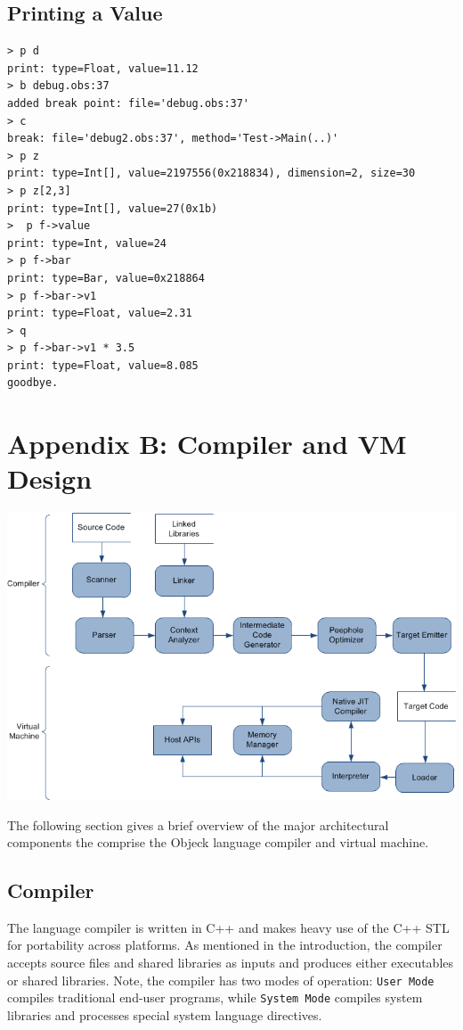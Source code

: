 \documentclass[11pt]{article}
\begin{document}
\subsection{Printing a Value}
\begin{verbatim}
> p d
print: type=Float, value=11.12
> b debug.obs:37
added break point: file='debug.obs:37'
> c
break: file='debug2.obs:37', method='Test->Main(..)'
> p z
print: type=Int[], value=2197556(0x218834), dimension=2, size=30
> p z[2,3]
print: type=Int[], value=27(0x1b)
>  p f->value
print: type=Int, value=24
> p f->bar
print: type=Bar, value=0x218864
> p f->bar->v1
print: type=Float, value=2.31
> q
> p f->bar->v1 * 3.5
print: type=Float, value=8.085
goodbye.
\end{verbatim}

\section{Appendix B: Compiler and VM Design}
\includegraphics[scale=0.60]{../../images/compiler_data_flow.png}

The following section gives a brief overview of the major
architectural components the comprise the Objeck language compiler and
virtual machine.

\subsection{Compiler}
The language compiler is written in C++ and makes heavy use of the C++
STL for portability across platforms.  As mentioned in the
introduction, the compiler accepts source files and shared libraries
as inputs and produces either executables or shared libraries.  Note,
the compiler has two modes of operation: \texttt{User Mode} compiles
traditional end-user programs, while \texttt{System Mode} compiles
system libraries and processes special system language directives.
\end{document}
